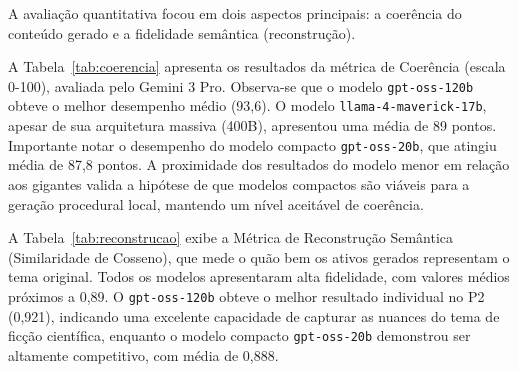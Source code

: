 A avaliação quantitativa focou em dois aspectos principais: a coerência do conteúdo gerado
e a fidelidade semântica (reconstrução).

A Tabela~\ref{tab:coerencia} apresenta os resultados da métrica de Coerência
(escala 0-100), avaliada pelo Gemini 3 Pro. Observa-se que o modelo
\texttt{gpt-oss-120b} obteve o melhor desempenho médio (93,6). O modelo
\texttt{llama-4-maverick-17b}, apesar de sua arquitetura massiva (400B),
apresentou uma média de 89 pontos. Importante notar o desempenho do modelo
compacto \texttt{gpt-oss-20b}, que atingiu média de 87,8 pontos. A proximidade
dos resultados do modelo menor em relação aos gigantes valida a hipótese de que
modelos compactos são viáveis para a geração procedural local, mantendo um nível
aceitável de coerência.

\begin{table}[h!]
    \centering
\end{table}

A Tabela~\ref{tab:reconstrucao} exibe a Métrica de Reconstrução Semântica
(Similaridade de Cosseno), que mede o quão bem os ativos gerados representam o
tema original. Todos os modelos apresentaram alta fidelidade, com valores médios
próximos a 0,89. O \texttt{gpt-oss-120b} obteve o melhor resultado individual no
P2 (0,921), indicando uma excelente capacidade de capturar as nuances do tema de
ficção científica, enquanto o modelo compacto \texttt{gpt-oss-20b} demonstrou
ser altamente competitivo, com média de 0,888.

